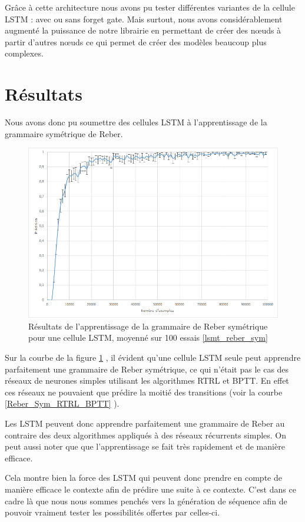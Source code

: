 Grâce à cette architecture nous avons pu tester différentes variantes de la cellule LSTM : avec ou sans forget gate. Mais surtout, nous avons considérablement augmenté la puissance de notre librairie en permettant de créer des n\oe{}uds à partir d'autres n\oe{}uds ce qui permet de créer des modèles beaucoup plus complexes.

\section{Résultats}

Nous avons donc pu soumettre des cellules LSTM à l'apprentissage de la grammaire symétrique de Reber. 

\begin{figure}[h!]
\begin{center}
\includegraphics[scale=0.5]{images/chapter6/LSTM_Reber_Sym.png}
\caption{Résultats de l'apprentissage de la grammaire de Reber symétrique pour une cellule LSTM, moyenné sur 100 essais
\ref{lsmt_reber_sym}}
\label{Reber_Sym_LSTM}
\end{center}
\end{figure}

Sur la courbe de la figure \ref{Reber_Sym_LSTM} , il évident qu'une cellule LSTM seule peut apprendre parfaitement une grammaire de Reber symétrique, ce qui n'était pas le cas des réseaux de neurones simples utilisant les algorithmes RTRL et BPTT. En effet ces réseaux ne pouvaient que prédire la moitié des transitions (voir la courbe \ref{Reber_Sym_RTRL_BPTT} ).

Les LSTM peuvent donc apprendre parfaitement une grammaire de Reber au contraire des deux algorithmes appliqués à des réseaux récurrents simples. On peut aussi noter que que l'apprentissage se fait très rapidement et de manière efficace. 

Cela montre bien la force des LSTM qui peuvent donc prendre en compte de manière efficace le contexte afin de prédire une suite à ce contexte. C'est dans ce cadre là que nous nous sommes penchés vers la génération de séquence afin de pouvoir vraiment tester les possibilités offertes par celles-ci.